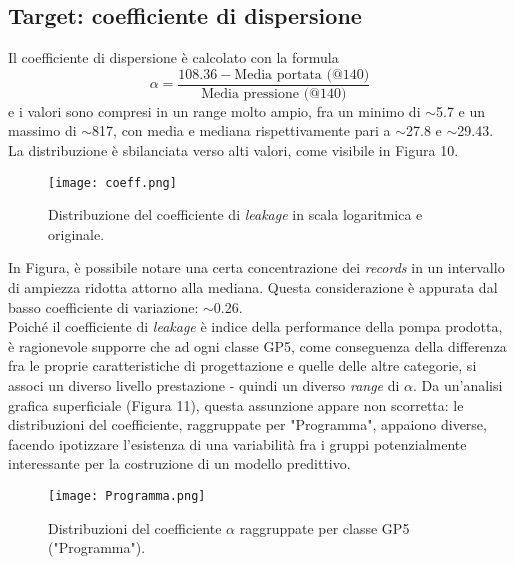 \documentclass[fleqn,10pt]{SelfArx} %
\begin{document}
\subsection{Target: coefficiente di dispersione}
Il coefficiente di dispersione è calcolato con la formula
\begin{equation}\label{eq}
    \alpha=\frac{108.36-\text{Media portata (@140)}}{\text{Media pressione (@140)}}
\end{equation}
e i valori sono compresi in un range molto ampio, fra un minimo di $\sim$5.7 e un massimo di $\sim$817, con media e mediana rispettivamente pari a $\sim$27.8 e $\sim$29.43. La distribuzione è sbilanciata verso alti valori, come visibile in Figura 10.
\begin{figure}[H]
    \centering
    \texttt{[image: coeff.png]}
    \label{fig:em}
    \caption{Distribuzione del coefficiente di \textit{leakage} in scala logaritmica e originale.}
\end{figure}
In Figura, è possibile notare una certa concentrazione dei \textit{records} in un intervallo di ampiezza ridotta attorno alla mediana. Questa considerazione è appurata dal basso coefficiente di variazione: $\sim$0.26.\\
Poiché il coefficiente di \textit{leakage} è indice della performance della pompa prodotta, è ragionevole supporre che ad ogni classe GP5, come conseguenza della differenza fra le proprie caratteristiche di progettazione e quelle delle altre categorie, si associ un diverso livello prestazione - quindi un diverso \textit{range} di $\alpha$. Da un'analisi grafica superficiale (Figura 11), questa assunzione appare non scorretta: le distribuzioni del coefficiente, raggruppate per "Programma", appaiono diverse, facendo ipotizzare l'esistenza di una variabilità fra i gruppi potenzialmente interessante per la costruzione di un modello predittivo. 
\begin{figure}[H]
    \centering
    \texttt{[image: Programma.png]}
    \label{fig:em}
    \caption{Distribuzioni del coefficiente $\alpha$ raggruppate per classe GP5 ("Programma").}
\end{figure}
\end{document}
